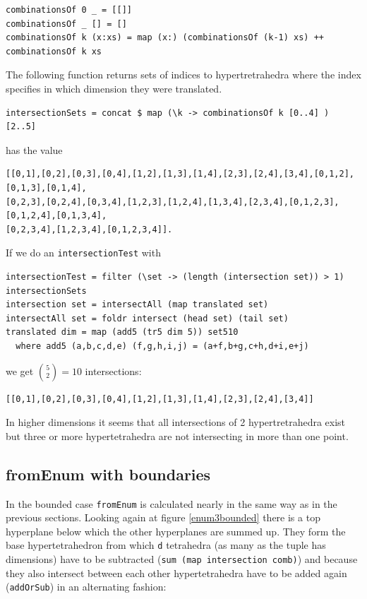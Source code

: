 \documentclass{tmr}
\begin{document}
\begin{Verbatim}
combinationsOf 0 _ = [[]]
combinationsOf _ [] = []
combinationsOf k (x:xs) = map (x:) (combinationsOf (k-1) xs) ++ combinationsOf k xs
\end{Verbatim}

The following function returns sets of indices to hypertretrahedra where the index specifies in which dimension they were translated.

\begin{Verbatim}
intersectionSets = concat $ map (\k -> combinationsOf k [0..4] ) [2..5]
\end{Verbatim}

has the value

\begin{Verbatim}
[[0,1],[0,2],[0,3],[0,4],[1,2],[1,3],[1,4],[2,3],[2,4],[3,4],[0,1,2],[0,1,3],[0,1,4],
[0,2,3],[0,2,4],[0,3,4],[1,2,3],[1,2,4],[1,3,4],[2,3,4],[0,1,2,3],[0,1,2,4],[0,1,3,4],
[0,2,3,4],[1,2,3,4],[0,1,2,3,4]].
\end{Verbatim}

If we do an \verb|intersectionTest| with
\begin{Verbatim}
intersectionTest = filter (\set -> (length (intersection set)) > 1) intersectionSets
intersection set = intersectAll (map translated set)
intersectAll set = foldr intersect (head set) (tail set)
translated dim = map (add5 (tr5 dim 5)) set510
  where add5 (a,b,c,d,e) (f,g,h,i,j) = (a+f,b+g,c+h,d+i,e+j)
\end{Verbatim}
we get $\binom{5}{2} = 10$ intersections:

\begin{Verbatim}
[[0,1],[0,2],[0,3],[0,4],[1,2],[1,3],[1,4],[2,3],[2,4],[3,4]]
\end{Verbatim}

In higher dimensions it seems that all intersections of 2 hypertretrahedra exist but 
three or more hypertetrahedra are not intersecting in more than one point.

\subsection{fromEnum with boundaries}
In the bounded case \verb|fromEnum| is calculated nearly in the same way as in the 
previous sections. Looking again at figure \ref{enum3bounded} there is a top hyperplane 
below which the other hyperplanes are summed up. They form the base hypertetrahedron 
from which \verb|d| tetrahedra (as many as the tuple has dimensions) have to be subtracted 
(\verb|sum (map intersection comb)|) and because they also intersect between each other 
hypertetrahedra have to be added again (\verb|addOrSub|) in an alternating fashion:
\end{document}
